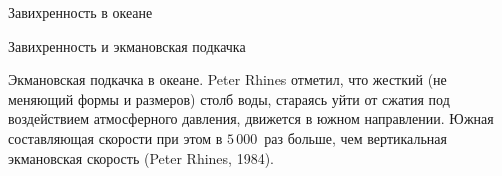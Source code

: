 \begin{chapter}{Завихренность в океане}
\begin{section}{Завихренность и экмановская подкачка}
\begin{paragraph}{Экмановская подкачка в океане.}
Peter Rhines отметил, что жесткий (не меняющий формы и размеров)
столб воды, стараясь уйти от сжатия под воздействием атмосферного давления, 
движется в южном направлении. Южная составляющая скорости при этом
в $5\,000$~раз больше, чем вертикальная экмановская скорость%
 (Peter Rhines, 1984).
%


\end{paragraph}
\end{section}
\end{chapter}
